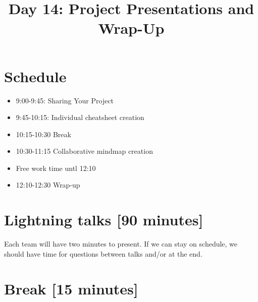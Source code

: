 \title{Day 14: Project Presentations and Wrap-Up}

\section{Schedule}
\begin{itemize}
\item 9:00-9:45: Sharing Your Project
\item 9:45-10:15: Individual cheatsheet creation
\item 10:15-10:30 Break
\item 10:30-11:15 Collaborative mindmap creation

\item Free work time untl 12:10
\item 12:10-12:30 Wrap-up
\end{itemize}

\section{Lightning talks [90 minutes]}

Each team will have two minutes to present. If we can stay on schedule, we should have time for questions between talks and/or at the end.



\section{Break [15 minutes]}



